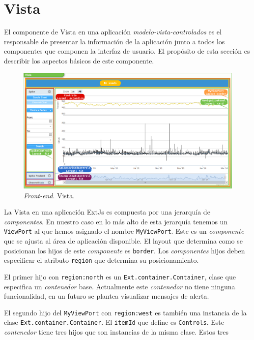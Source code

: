 \section{Vista}
	El componente de Vista en una aplicación \emph{modelo-vista-controlados}\cite{MVCWiki} es el responsable de presentar la información de la
	aplicación junto a todos los componentes que componen la interfaz de usuario. El propósito de esta sección es describir los aspectos básicos
	de este componente.
	\begin{figure}[h]
		\centering
		\includegraphics[keepaspectratio, width=1\textwidth]{./img/vista.png}
		\caption{\emph{Front-end}. Vista.}   
		\label{fig:vista}
	\end{figure}
	\par
	La Vista en una aplicación ExtJs es compuesta por una jerarquía de \emph{componentes}. En nuestro caso en lo más alto de esta jerarquía
	tenemos un \texttt{ViewPort} al que hemos asignado el nombre \texttt{MyViewPort}. Este es un \emph{componente} que se ajusta al área de
	aplicación disponible. El layout que determina como se posicionan los hijos de este \emph{componente} es \texttt{border}. Los
	\emph{componentes} hijos deben especificar el atributo \texttt{region} que determina su posicionamiento.
	\par
	El primer hijo con \texttt{region:north} es un \texttt{Ext.container.Container}, clase que especifica un \emph{contenedor} base. Actualmente este
	\emph{contenedor} no tiene ninguna funcionalidad, en un futuro se plantea visualizar mensajes de alerta.
	\par
	El segundo hijo del \texttt{MyViewPort} con \texttt{region:west} es también una instancia de la clase \texttt{Ext.container.Container}. El
	\texttt{itemId} que define es \texttt{Controls}. Este \emph{contenedor} tiene tres hijos que son instancias de la misma clase. Estos tres
